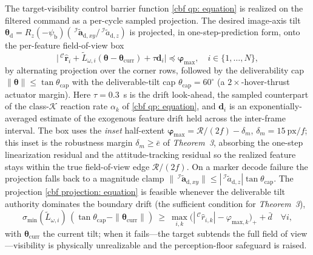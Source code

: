\documentclass{IEEEtaes}
\begin{document}
The target-visibility control barrier function \eqref{cbf qp: equation} is realized on the filtered command as a per-cycle sampled projection. The desired image-axis tilt $\boldsymbol{\theta}_\text{d}=R_z(-\psi_\text{b})(\,^\mathcal{I}\tilde{\boldsymbol{a}}_{\text{d},xy}/\,^\mathcal{I}\tilde{a}_{\text{d},z})$ is projected, in one-step-prediction form, onto the per-feature field-of-view box
\begin{equation} \label{cbf projection: equation}
    \big|\,^\mathcal{C}\hat{\boldsymbol{r}}_i+\tilde{L}_{\omega,i}(\boldsymbol{\theta}-\boldsymbol{\theta}_\text{curr})+\tau\boldsymbol{d}_i\big|\preceq\boldsymbol{\varphi}_\text{max},\quad i\in\{1,\ldots,N\},
\end{equation}
by alternating projection over the corner rows, followed by the deliverability cap $\|\boldsymbol{\theta}\|\le\tan\theta_\text{cap}$ with the deliverable-tilt cap $\theta_\text{cap}=60^\circ$ (a $2\times$-hover-thrust actuator margin). Here $\tau=0.3$~s is the drift look-ahead, the sampled counterpart of the class-$\mathcal{K}$ reaction rate $\alpha_k$ of \eqref{cbf qp: equation}, and $\boldsymbol{d}_i$ is an exponentially-averaged estimate of the exogenous feature drift held across the inter-frame interval. The box uses the \emph{inset} half-extent $\boldsymbol{\varphi}_\text{max}=\mathcal{R}/(2f)-\delta_m$, $\delta_m=15~\text{px}/f$; this inset is the robustness margin $\delta_m\ge\bar{e}$ of \textit{Theorem~3}, absorbing the one-step linearization residual and the attitude-tracking residual so the realized feature stays within the true field-of-view edge $\mathcal{R}/(2f)$. On a marker decode failure the projection falls back to a magnitude clamp $\|\,^\mathcal{I}\tilde{\boldsymbol{a}}_{\text{d},xy}\|\le|\,^\mathcal{I}\tilde{a}_{\text{d},z}|\tan\theta_\text{cap}$. The projection \eqref{cbf projection: equation} is feasible whenever the deliverable tilt authority dominates the boundary drift (the sufficient condition for \textit{Theorem~3}),
\begin{equation} \label{cbf feasibility: equation}
    \sigma_{\min}(\tilde{L}_{\omega,i})\,(\tan\theta_\text{cap}-\|\boldsymbol{\theta}_\text{curr}\|)\ \ge\ \max_{i,k}\big(|\,^\mathcal{C}\hat{r}_{i,k}|-\varphi_{\text{max},k}\big)_+ + \bar{d}\quad\forall i,
\end{equation}
with $\boldsymbol{\theta}_\text{curr}$ the current tilt; when it fails---the target subtends the full field of view---visibility is physically unrealizable and the perception-floor safeguard is raised.
\end{document}
